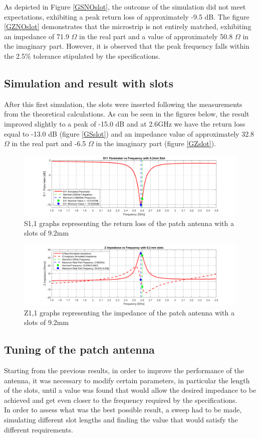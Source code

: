 \documentclass[]{article}
\begin{document}
As depicted in Figure \eqref{GSNOslot}, the outcome of the simulation did not meet expectations, exhibiting a peak return loss of approximately -9.5 dB. The figure \eqref{GZNOslot} demonstrates that the microstrip is not entirely matched, exhibiting an impedance of 71.9 $\Omega$ in the real part and a value of approximately 50.8 $\Omega$ in the imaginary part. However, it is observed that the peak frequency falls within the 2.5\% tolerance stipulated by the specifications.
\subsection{Simulation and result with slots}
After this first simulation, the slots were inserted following the measurements from the theoretical calculations. As can be seen in the figures below, the result improved slightly to a peak of -15.0 dB and at 2.6GHz we have the return loss equal to -13.0 dB (figure \eqref{GSslot}) and an impedance value of approximately 32.8 $\Omega$ in the real part and -6.5 $\Omega$  in the imaginary part (figure \eqref{GZslot}).
 \begin{figure}[H]
	\centering
	\includegraphics[width=0.85\linewidth]{img/img5}
	\caption{S1,1 graphs representing the return loss of the patch antenna with a slots of 9.2mm}
	\label{GSslot}
\end{figure}

\begin{figure}[H]
	\centering
	\includegraphics[width=0.85\linewidth]{img/img6}
	\caption{Z1,1 graphs representing the impedance of the patch antenna with a slots of 9.2mm}
	\label{GZslot}
\end{figure}
\newpage
 \subsection{Tuning of the patch antenna}
 Starting from the previous results, in order to improve the performance of the antenna, it was necessary to modify certain parameters, in particular the length of the slots, until a value was found that would allow the desired impedance to be achieved and get even closer to the frequency required by the specifications.\\
  In order to assess what was the best possible result, a sweep had to be made, simulating different slot lengths and finding the value that would satisfy the different requirements.\\
  
\end{document}

